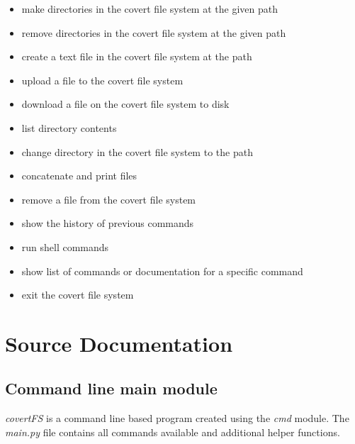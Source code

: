 \documentclass[letterpaper,10pt,english]{sphinxmanual}
\begin{document}
\begin{itemize}
\begin{itemize}
\item {} 
 make directories in the covert file system at the given path

\item {} 
 remove directories in the covert file system at the given path

\item {} 
 create a text file in the covert file system at the path

\item {} 
 upload a file to the covert file system

\item {} 
 download a file on the covert file system to disk

\item {} 
 \footnotemark[1] list directory contents

\item {} 
 change directory in the covert file system to the path

\item {} 
 concatenate and print files

\item {} 
 remove a file from the covert file system

\item {} 
 show the history of previous commands

\item {} 
 run shell commands

\item {} 
 \footnotemark[1] show list of commands or documentation for a specific command

\item {} 
 exit the covert file system

\end{itemize}

\end{itemize}


\chapter{Source Documentation}
\label{index:source-documentation}

\section{Command line main module}
\label{main:command-line-main-module}\label{main::doc}
\emph{covertFS} is a command line based program created using the \emph{cmd} module. The \emph{main.py} file contains all commands available and additional helper functions.
\label{main:module-main}
\end{document}
